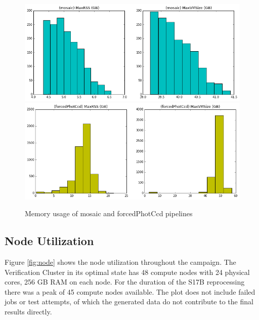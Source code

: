 \documentclass[DM,authoryear,toc]{lsstdoc}
\begin{document}
\begin{enumerate}
\begin{figure}[htbp]
        \begin{center}
                 \includegraphics[width=\textwidth]{figures/maxm_mosaic}
                 \includegraphics[width=\textwidth]{figures/maxm_forcPhotCcd}
                 \caption{Memory usage of mosaic and forcedPhotCcd pipelines}
                 \label{fig:maxm}
        \end{center}
\end{figure}

\end{enumerate}

\subsection{Node Utilization}

Figure \ref{fig:node} shows the node utilization throughout the campaign.
The Verification Cluster in its optimal state has 48 compute nodes with 24 physical cores, 256 GB RAM on each node.  For the duration of the S17B reprocessing there was a peak of 45 compute nodes available. The plot does not include failed jobs or test attempts, of which the generated data do not contribute to the final results directly.
\end{document}
